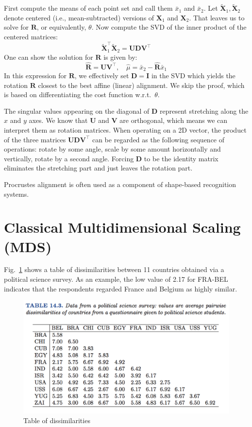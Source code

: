 \documentclass[a4paper]{article}
\begin{document}
First compute the means of each point set and call them $\bar{x}_1$ and $\bar{x}_2$.  Let $\tilde{\mathbf{X}}_1, \tilde{\mathbf{X}}_2$ denote centered (i.e., mean-subtracted) versions of $\mathbf{X}_1$ and $\mathbf{X}_2$.  That leaves us to solve for $\mathbf{R}$, or equivalently, $\theta$.  Now compute the SVD of the inner product of the centered matrices:
$$
\tilde{\mathbf{X}}_1^\top \tilde{\mathbf{X}}_2 = \mathbf{UDV}^\top
$$
One can show the solution for $\mathbf{R}$ is given by:
$$
\hat{\mathbf{R}} = \mathbf{UV}^\top,\quad \hat{\mu} = \bar{x}_2 - \hat{\mathbf{R}}\bar{x}_1
$$
In this expression for $\mathbf{R}$, we effectively set $\mathbf{D}=\mathbf{I}$ in the SVD which yields the rotation $\mathbf{R}$ closest to the best affine (linear) alignment.  We skip the proof, which is based on differentiating the cost function w.r.t.\ $\theta$.

The singular values appearing on the diagonal of $\mathbf{D}$ represent stretching along the $x$ and $y$ axes.  We know that $\mathbf{U}$ and $\mathbf{V}$ are orthogonal, which means we can interpret them as rotation matrices.  When operating on a 2D vector, the product of the three matrices $\mathbf{UDV}^\top$ can be regarded as the following sequence of operations: rotate by some angle, scale by some amount horizontally and vertically, rotate by a second angle.  Forcing $\mathbf{D}$ to be the identity matrix eliminates the stretching part and just leaves the rotation part.

Procrustes alignment is often used as a component of shape-based recognition systems.


\section{Classical Multidimensional Scaling (MDS)}
Fig.~\ref{fig:dissimil} shows a table of dissimilarities between 11 countries obtained via a political science survey.  As an example, the low value of 2.17 for FRA-BEL indicates that the respondents regarded France and Belgium as highly similar.

\begin{figure}
\centering
\includegraphics[width=1.0\textwidth]{table14_3.png}
\caption{\label{fig:dissimil}Table of dissimilarities}
\end{figure}
\end{document}
